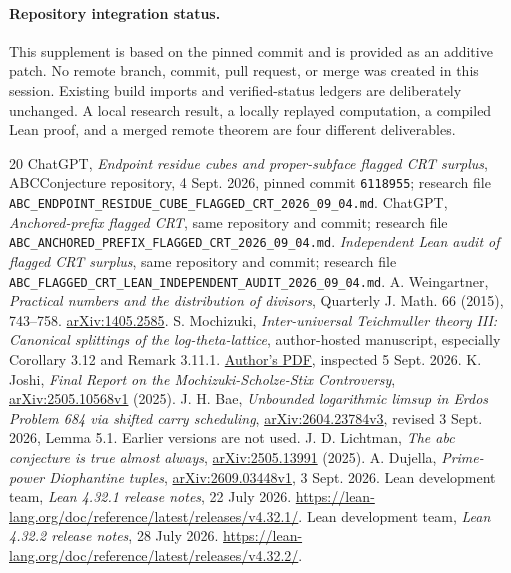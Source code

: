 \documentclass[11pt]{article}
\theoremstyle{definition}\newtheorem{definition}[theorem]{Definition}
\theoremstyle{remark}\newtheorem{remark}[theorem]{Remark}
\begin{document}
\paragraph{Repository integration status.}
This supplement is based on the pinned commit and is provided as an additive
patch. No remote branch, commit, pull request, or merge was created in this
session. Existing build imports and verified-status ledgers are deliberately
unchanged. A local research result, a locally replayed computation, a compiled
Lean proof, and a merged remote theorem are four different deliverables.

\begin{thebibliography}{20}\small
{} ChatGPT, \emph{Endpoint residue cubes and proper-subface flagged CRT surplus}, ABCConjecture repository, 4 Sept. 2026, pinned commit \texttt{6118955}; research file \texttt{ABC\_ENDPOINT\_RESIDUE\_CUBE\_FLAGGED\_CRT\_2026\_09\_04.md}.
 ChatGPT, \emph{Anchored-prefix flagged CRT}, same repository and commit; research file \texttt{ABC\_ANCHORED\_PREFIX\_FLAGGED\_CRT\_2026\_09\_04.md}.
 \emph{Independent Lean audit of flagged CRT surplus}, same repository and commit; research file \texttt{ABC\_FLAGGED\_CRT\_LEAN\_INDEPENDENT\_AUDIT\_2026\_09\_04.md}.
 A. Weingartner, \emph{Practical numbers and the distribution of divisors}, Quarterly J. Math. 66 (2015), 743--758. \href{https://arxiv.org/abs/1405.2585}{arXiv:1405.2585}.
 S. Mochizuki, \emph{Inter-universal Teichmuller theory III: Canonical splittings of the log-theta-lattice}, author-hosted manuscript, especially Corollary 3.12 and Remark 3.11.1. \href{https://www.kurims.kyoto-u.ac.jp/~motizuki/Inter-universal\%20Teichmuller\%20Theory\%20III.pdf}{Author's PDF}, inspected 5 Sept. 2026.
 K. Joshi, \emph{Final Report on the Mochizuki-Scholze-Stix Controversy}, \href{https://arxiv.org/abs/2505.10568}{arXiv:2505.10568v1} (2025).
 J. H. Bae, \emph{Unbounded logarithmic limsup in Erdos Problem 684 via shifted carry scheduling}, \href{https://arxiv.org/abs/2604.23784}{arXiv:2604.23784v3}, revised 3 Sept. 2026, Lemma 5.1. Earlier versions are not used.
 J. D. Lichtman, \emph{The abc conjecture is true almost always}, \href{https://arxiv.org/abs/2505.13991}{arXiv:2505.13991} (2025).
 A. Dujella, \emph{Prime-power Diophantine tuples}, \href{https://arxiv.org/abs/2609.03448}{arXiv:2609.03448v1}, 3 Sept. 2026.
 Lean development team, \emph{Lean 4.32.1 release notes}, 22 July 2026. \url{https://lean-lang.org/doc/reference/latest/releases/v4.32.1/}.
 Lean development team, \emph{Lean 4.32.2 release notes}, 28 July 2026. \url{https://lean-lang.org/doc/reference/latest/releases/v4.32.2/}.
\end{thebibliography}
\end{document}
